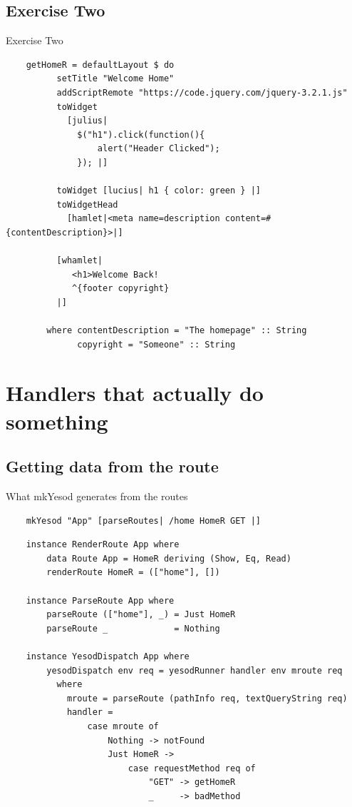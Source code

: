 \documentclass[pdf]{beamer}
\begin{document}
\subsection{Exercise Two}
\begin{frame}[fragile]{Exercise Two}
  \begin{verbatim}
    getHomeR = defaultLayout $ do
          setTitle "Welcome Home"
          addScriptRemote "https://code.jquery.com/jquery-3.2.1.js"
          toWidget
            [julius|
              $("h1").click(function(){
                  alert("Header Clicked");
              }); |]

          toWidget [lucius| h1 { color: green } |]
          toWidgetHead
            [hamlet|<meta name=description content=#{contentDescription}>|]

          [whamlet|
             <h1>Welcome Back!
             ^{footer copyright}
          |]

        where contentDescription = "The homepage" :: String
              copyright = "Someone" :: String
  \end{verbatim}
\end{frame}

\section{Handlers that actually do something}
\subsection{Getting data from the route}
\begin{frame}[fragile]{What mkYesod generates from the routes}
  \begin{verbatim}
    mkYesod "App" [parseRoutes| /home HomeR GET |]
  \end{verbatim}
  \pause
  \begin{verbatim}
    instance RenderRoute App where
        data Route App = HomeR deriving (Show, Eq, Read)
        renderRoute HomeR = (["home"], [])

    instance ParseRoute App where
        parseRoute (["home"], _) = Just HomeR
        parseRoute _             = Nothing

    instance YesodDispatch App where
        yesodDispatch env req = yesodRunner handler env mroute req
          where
            mroute = parseRoute (pathInfo req, textQueryString req)
            handler =
                case mroute of
                    Nothing -> notFound
                    Just HomeR ->
                        case requestMethod req of
                            "GET" -> getHomeR
                            _     -> badMethod
  \end{verbatim}
\end{frame}
\end{document}
